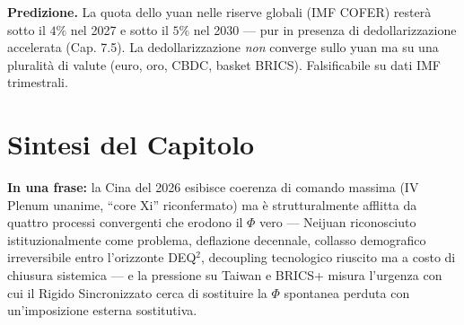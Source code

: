 \Conj{} \textbf{Predizione.} La quota dello yuan nelle riserve globali
(IMF COFER) resterà sotto il \(4\%\) nel 2027 e sotto il \(5\%\) nel
2030 --- pur in presenza di dedollarizzazione accelerata (Cap. 7.5). La
dedollarizzazione \emph{non} converge sullo yuan ma su una pluralità di
valute (euro, oro, CBDC, basket BRICS). Falsificabile su dati IMF
trimestrali.



\section{Sintesi del Capitolo}\label{sintesi-del-capitolo}

\Proved{} \textbf{In una frase:} la Cina del 2026 esibisce coerenza di
comando massima (IV Plenum unanime, ``core Xi'' riconfermato) ma è
strutturalmente afflitta da quattro processi convergenti che erodono il
\(\Phi\) vero --- Neijuan riconosciuto istituzionalmente come problema,
deflazione decennale, collasso demografico irreversibile entro
l'orizzonte DEQ$^2$, decoupling tecnologico riuscito ma a costo di chiusura
sistemica --- e la pressione su Taiwan e BRICS+ misura l'urgenza con cui
il Rigido Sincronizzato cerca di sostituire la \(\Phi\) spontanea
perduta con un'imposizione esterna sostitutiva.

